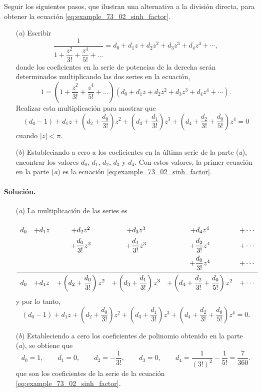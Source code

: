 \documentclass[a4paper]{report}
\begin{document}
Seguir los siguientes pasos, que ilustran una alternativa a la división directa, para obtener la ecuación \ref{eq:example_73_02_sinh_factor}.
\begin{enumerate}
 \item[(\textit{a})] Escribir
 \[
  \dfrac{1}{1+\dfrac{z^2}{3!}+\dfrac{z^4}{5!}+\dots}=d_0+d_1z+d_2z^2+d_3z^3+d_4z^4+\cdots,
 \]
 donde los coeficientes en la serie de potencias de la derecha serán determinados multiplicando las dos series en la ecuación,
 \[
  1=\left(1+\dfrac{z^2}{3!}+\dfrac{z^4}{5!}+\dots\right)\left(d_0+d_1z+d_2z^2+d_3z^3+d_4z^4+\cdots\right).
 \]
 Realizar esta multiplicación para mostrar que 
 \[
  \left(d_0-1\right)+d_1z+\left(d_2+\frac{d_0}{3!}\right)z^2+\left(d_3+\frac{d_1}{3!}\right)z^3+\left(d_4+\frac{d_2}{3!}+\frac{d_0}{5!}\right)z^4=0
 \]
 cuando \(|z|<\pi\).
 \item[(\textit{b})] Estableciando a cero a los coeficientes en la última serie de la parte (\textit{a}), encontrar los valores \(d_0,\,d_1,\,d_2,\,d_3\) y \(d_4\). Con estos valores, la primer ecuación en la parte (\textit{a}) es la ecuación \ref{eq:example_73_02_sinh_factor}.  
\end{enumerate}

\paragraph{Solución.} 
\begin{enumerate}
 \item[(\textit{a})] La multiplicación de las series es
\[
\setlength\extrarowheight{10pt}
\begin{array}[t]{ccccccc}
 d_0 & +d_1z & +d_2z^2 & +d_3z^3 & +d_4z^4 & +\cdots\\
   &  & +\dfrac{d_0}{3!}z^2 & +\dfrac{d_1}{3!}z^3 & +\dfrac{d_2}{3!}z^4 & +\cdots\\
   &  &                 &               & +\dfrac{d_0}{3!}z^4 & +\cdots\\[\medskipamount]
\cline{1-6}
 d_0 & +d_1z & +\left(d_2+\dfrac{d_0}{3!}\right)z^2 & +\left(d_3+\dfrac{d_1}{3!}\right)z^3 & +\left(d_4+\dfrac{d_2}{3!}+\dfrac{d_0}{5!}\right)z^2 & +\cdots
\end{array}
\]
y por lo tanto,
 \[
  \left(d_0-1\right)+d_1z+\left(d_2+\frac{d_0}{3!}\right)z^2+\left(d_3+\frac{d_1}{3!}\right)z^3+\left(d_4+\frac{d_2}{3!}+\frac{d_0}{5!}\right)z^4=0.
 \]
 \item[(\textit{b})] Estableciendo a cero los coeficientes de polinomio obtenido en la parte (\textit{a}), se obtiene que 
 \[
  d_0=1,\qquad 
  d_1=0,\qquad
  d_2=-\frac{1}{3!},\qquad
  d_3=0,\qquad 
  d_4=\frac{1}{(3!)^2}-\frac{1}{5!}=\frac{7}{360}.
 \]
 que son los coeficientes de la serie de la ecuación \ref{eq:example_73_02_sinh_factor}.  
\end{enumerate}
\end{document}
